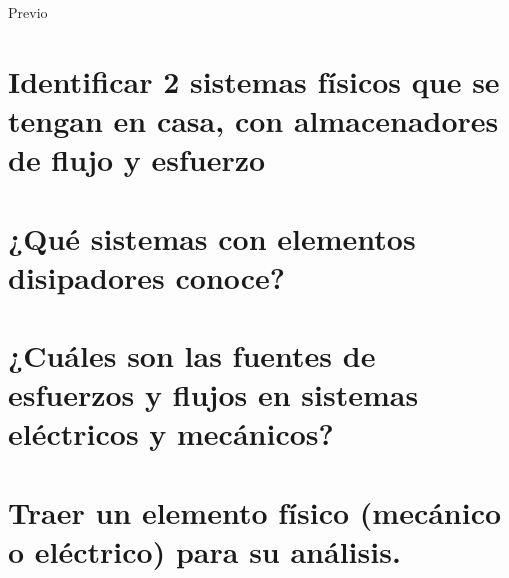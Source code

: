 {\Huge Previo }

\noindent \justifying


\section{Identificar 2 sistemas físicos que se tengan en casa, con almacenadores de flujo y esfuerzo}
\section{¿Qué sistemas con elementos disipadores conoce?}
\section{¿Cuáles son las fuentes de esfuerzos y flujos en sistemas eléctricos y mecánicos?}
\section{Traer un elemento físico (mecánico o eléctrico) para su análisis.}


